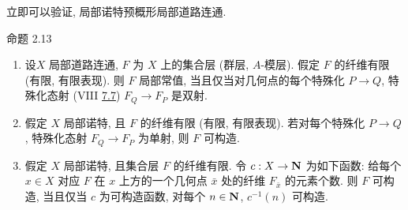 立即可以验证, 局部诺特预概形局部道路连通.

\begin{enonce*}{命题 2.13}
\begin{enumerate}
\renewcommand{\theenumi}{\roman{enumi}}
\renewcommand{\labelenumi}{(\theenumi)}
\item 设\pageoriginale $X$ 局部道路连通,
$F$ 为 $X$ 上的集合层 (\resp 群层, \resp $A$-模层).
假定 $F$ 的纤维有限 (\resp 有限, \resp 有限表现).
则 $F$ 局部常值, 当且仅当对几何点的每个特殊化 $P\rightarrow Q$,
特殊化态射 {\rm (VIII \hyperref[VIII.subsec7.7]{7.7})} $F_Q\rightarrow F_P$ 是双射.

\item 假定 $X$ 局部诺特, 且 $F$ 的纤维有限 (\resp 有限, \resp 有限表现).
若对每个特殊化 $P\rightarrow Q$,
特殊化态射 $F_Q\rightarrow F_P$ 为单射, 则 $F$ 可构造.

\item 假定 $X$ 局部诺特, 且集合层 $F$ 的纤维有限.
令 $c:X\rightarrow \mathbf{N}$ 为如下函数:
给每个 $x\in X$ 对应 $F$ 在 $x$ 上方的一个几何点 $\bar{x}$ 处的纤维
$F_{\bar{x}}$ 的元素个数.
则 $F$ 可构造, 当且仅当 $c$ 为可构造函数,
\ie 对每个 $n\in \mathbf{N}$, $c^{-1}(n)$ 可构造.
\end{enumerate}
\end{enonce*}

